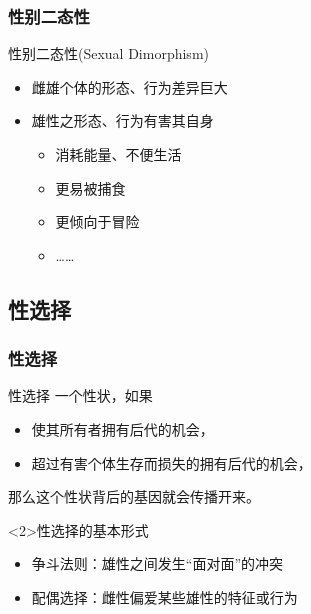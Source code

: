 \documentclass[UTF8,lualatex]{ctexbeamer}
\begin{document}

\begin{frame}
    \frametitle{性别二态性}
    \begin{block}{性别二态性(Sexual Dimorphism)}
        \begin{itemize}
            \item 雌雄个体的形态、行为差异巨大
            \item 雄性之形态、行为有害其自身
                \begin{itemize}
                    \item 消耗能量、不便生活
                    \item 更易被捕食
                    \item 更倾向于冒险
                    \item ……
                \end{itemize}
        \end{itemize}
    \end{block}
\end{frame}

\subsection{性选择}

\begin{frame}
    \frametitle{性选择}
    \begin{block}{性选择}
        一个性状，如果
        \begin{itemize}
            \item 使其所有者拥有后代的机会，
            \item 超过有害个体生存而损失的拥有后代的机会，
        \end{itemize}
        那么这个性状背后的基因就会传播开来。
    \end{block}
    \begin{block}<2>{性选择的基本形式}
        \begin{itemize}
            \item 争斗法则：雄性之间发生“面对面”的冲突
            \item 配偶选择：雌性偏爱某些雄性的特征或行为
        \end{itemize}
    \end{block}
\end{frame}
\end{document}
